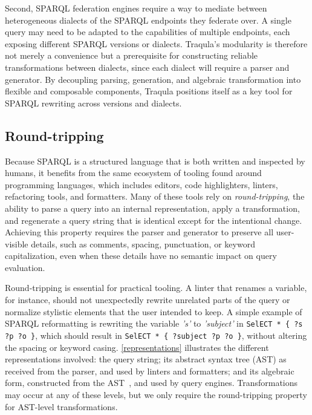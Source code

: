 \documentclass[runningheads]{llncs}
\begin{document}
    Second, SPARQL federation engines require a way to mediate between heterogeneous dialects of the SPARQL endpoints they federate over.
    A single query may need to be adapted to the capabilities of multiple endpoints, each exposing different SPARQL versions or dialects.
    Traqula's modularity is therefore not merely a convenience but a prerequisite for constructing reliable transformations between dialects,
    since each dialect will require a parser and generator.
    By decoupling parsing, generation, and algebraic transformation into flexible and composable components,
    Traqula positions itself as a key tool for SPARQL rewriting across versions and dialects.

    \subsection{Round-tripping}

    Because SPARQL is a structured language that is both written and inspected by humans,
    it benefits from the same ecosystem of tooling found around programming languages,
    which includes editors, code highlighters, linters, refactoring tools, and formatters.
    Many of these tools rely on \textit{round-tripping}, the ability to parse a query into an internal representation,
    apply a transformation, and regenerate a query string that is identical except for the intentional change.
    Achieving this property requires the parser and generator to preserve all user-visible details, such as comments, spacing,
    punctuation, or keyword capitalization, even when these details have no semantic impact on query evaluation.

    Round-tripping is essential for practical tooling.
    A linter that renames a variable, for instance,
    should not unexpectedly rewrite unrelated parts of the query or normalize stylistic elements that the user intended to keep.
    A simple example of SPARQL reformatting is rewriting the variable \textit{'s'} to \textit{'subject'} in
    \texttt{SelECT * \{ ?s ?p ?o \}}, which should result in \texttt{SelECT * \{ ?subject ?p ?o \}},
    without altering the spacing or keyword casing.
    \autoref{representations} illustrates the different representations involved:
    the query string;
    its abstract syntax tree (AST) as received from the parser, and used by linters and formatters;
    and its algebraic form, constructed from the AST~\cite{spec:sparqllang}, and used by query engines.
    Transformations may occur at any of these levels, but we only require the round-tripping property for AST-level transformations.
\end{document}
